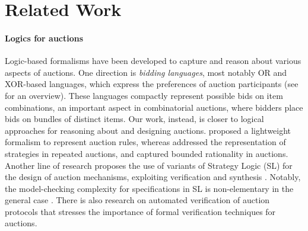 \documentclass[letterpaper]{article} %
\theoremstyle{definition}
\begin{document}
\section*{Related Work}




\paragraph{Logics for auctions} 
Logic-based formalisms have been developed to capture and reason about various aspects of auctions. One direction is  \textit{bidding languages}, %
 most notably OR and XOR-based languages, which express the preferences of auction participants (see \cite{Nisan2000} for an overview).
These languages compactly represent possible bids on item combinations, an important aspect in combinatorial auctions, where bidders place bids on bundles of distinct items. %
Our work, instead, is closer to logical approaches for reasoning about and designing auctions. \citet{MittelmannJAAMAS22} proposed a lightweight formalism to represent auction rules, whereas \citet{MittelmannAAMAS22} addressed the representation of strategies in repeated auctions, and \citet{MittelmannHP21} captured bounded rationality in auctions.   
Another line of research proposes the use of variants of Strategy Logic (SL) for the design of auction mechanisms, exploiting verification and synthesis 
\cite{MittelmannAIJ2025,MittelmannMMP23}. Notably, the model-checking complexity for specifications in SL is non-elementary in the general case \cite{MogaveroMPV14}. 
There is also research on automated verification of auction protocols \cite{GargRSS25,CaminatiK0R15,CKMRWW13} that stresses the importance of formal verification techniques for auctions. 
\end{document}
